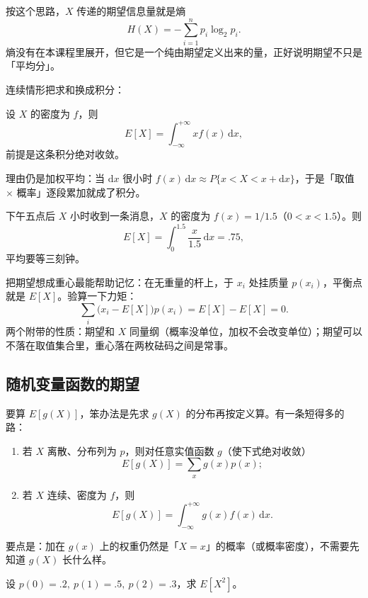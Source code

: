 按这个思路，$X$ 传递的期望信息量就是熵
\[
H(X)=-\sum_{i=1}^{n}p_i\log_2 p_i .
\]
熵没有在本课程里展开，但它是一个纯由期望定义出来的量，正好说明期望不只是「平均分」。

连续情形把求和换成积分：

\begin{definition}[连续型的期望]
设 $X$ 的密度为 $f$，则
\[
E[X]=\int_{-\infty}^{+\infty}xf(x)\,\mathrm{d}x ,
\]
前提是这条积分绝对收敛。
\end{definition}

理由仍是加权平均：当 $\mathrm{d}x$ 很小时 $f(x)\,\mathrm{d}x\approx P\{x<X<x+\mathrm{d}x\}$，于是「取值 $\times$ 概率」逐段累加就成了积分。

\begin{example}[等消息]
下午五点后 $X$ 小时收到一条消息，$X$ 的密度为 $f(x)=1/1.5$（$0<x<1.5$）。则
\[
E[X]=\int_0^{1.5}\frac{x}{1.5}\,\mathrm{d}x=.75,
\]
平均要等三刻钟。
\end{example}

把期望想成重心最能帮助记忆：在无重量的杆上，于 $x_i$ 处挂质量 $p(x_i)$，平衡点就是 $E[X]$。验算一下力矩：
\[
\sum_i\big(x_i-E[X]\big)p(x_i)=E[X]-E[X]=0 .
\]
两个附带的性质：期望和 $X$ 同量纲（概率没单位，加权不会改变单位）；期望可以不落在取值集合里，重心落在两枚砝码之间是常事。

\subsection{随机变量函数的期望}

要算 $E[g(X)]$，笨办法是先求 $g(X)$ 的分布再按定义算。有一条短得多的路：

\begin{proposition}
\label{prop:lotus}
\begin{enumerate}
\item 若 $X$ 离散、分布列为 $p$，则对任意实值函数 $g$（使下式绝对收敛）
\[
E[g(X)]=\sum_x g(x)p(x);
\]
\item 若 $X$ 连续、密度为 $f$，则
\[
E[g(X)]=\int_{-\infty}^{+\infty}g(x)f(x)\,\mathrm{d}x .
\]
\end{enumerate}
\end{proposition}

要点是：加在 $g(x)$ 上的权重仍然是「$X=x$」的概率（或概率密度），不需要先知道 $g(X)$ 长什么样。

\begin{example}
设 $p(0)=.2,\ p(1)=.5,\ p(2)=.3$，求 $E[X^2]$。
\end{example}

